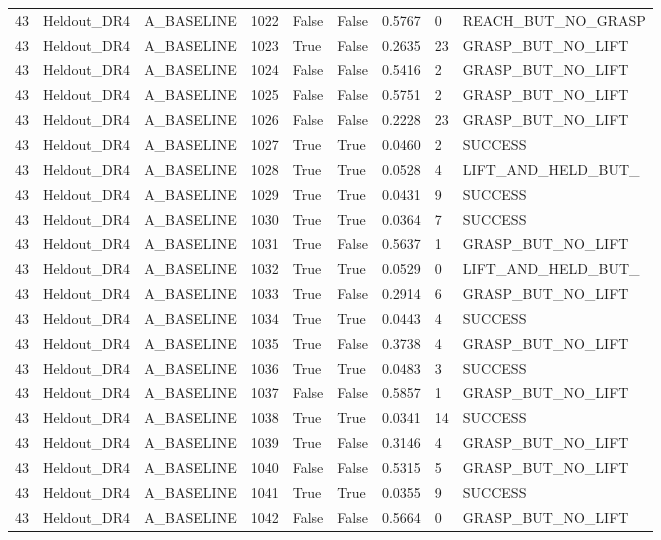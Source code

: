 \documentclass[11pt,a4paper,oneside]{book}
\begin{document}
\begin{longtable}{l l l l l l l l l}
43 & Heldout\_DR4 & A\_BASELINE & 1022 & False & False & 0.5767 & 0 & REACH\_BUT\_NO\_GRASP \\
43 & Heldout\_DR4 & A\_BASELINE & 1023 & True & False & 0.2635 & 23 & GRASP\_BUT\_NO\_LIFT \\
43 & Heldout\_DR4 & A\_BASELINE & 1024 & False & False & 0.5416 & 2 & GRASP\_BUT\_NO\_LIFT \\
43 & Heldout\_DR4 & A\_BASELINE & 1025 & False & False & 0.5751 & 2 & GRASP\_BUT\_NO\_LIFT \\
43 & Heldout\_DR4 & A\_BASELINE & 1026 & False & False & 0.2228 & 23 & GRASP\_BUT\_NO\_LIFT \\
43 & Heldout\_DR4 & A\_BASELINE & 1027 & True & True & 0.0460 & 2 & SUCCESS \\
43 & Heldout\_DR4 & A\_BASELINE & 1028 & True & True & 0.0528 & 4 & LIFT\_AND\_HELD\_BUT\_ \\
43 & Heldout\_DR4 & A\_BASELINE & 1029 & True & True & 0.0431 & 9 & SUCCESS \\
43 & Heldout\_DR4 & A\_BASELINE & 1030 & True & True & 0.0364 & 7 & SUCCESS \\
43 & Heldout\_DR4 & A\_BASELINE & 1031 & True & False & 0.5637 & 1 & GRASP\_BUT\_NO\_LIFT \\
43 & Heldout\_DR4 & A\_BASELINE & 1032 & True & True & 0.0529 & 0 & LIFT\_AND\_HELD\_BUT\_ \\
43 & Heldout\_DR4 & A\_BASELINE & 1033 & True & False & 0.2914 & 6 & GRASP\_BUT\_NO\_LIFT \\
43 & Heldout\_DR4 & A\_BASELINE & 1034 & True & True & 0.0443 & 4 & SUCCESS \\
43 & Heldout\_DR4 & A\_BASELINE & 1035 & True & False & 0.3738 & 4 & GRASP\_BUT\_NO\_LIFT \\
43 & Heldout\_DR4 & A\_BASELINE & 1036 & True & True & 0.0483 & 3 & SUCCESS \\
43 & Heldout\_DR4 & A\_BASELINE & 1037 & False & False & 0.5857 & 1 & GRASP\_BUT\_NO\_LIFT \\
43 & Heldout\_DR4 & A\_BASELINE & 1038 & True & True & 0.0341 & 14 & SUCCESS \\
43 & Heldout\_DR4 & A\_BASELINE & 1039 & True & False & 0.3146 & 4 & GRASP\_BUT\_NO\_LIFT \\
43 & Heldout\_DR4 & A\_BASELINE & 1040 & False & False & 0.5315 & 5 & GRASP\_BUT\_NO\_LIFT \\
43 & Heldout\_DR4 & A\_BASELINE & 1041 & True & True & 0.0355 & 9 & SUCCESS \\
43 & Heldout\_DR4 & A\_BASELINE & 1042 & False & False & 0.5664 & 0 & GRASP\_BUT\_NO\_LIFT \\

\end{longtable}
\end{document}
